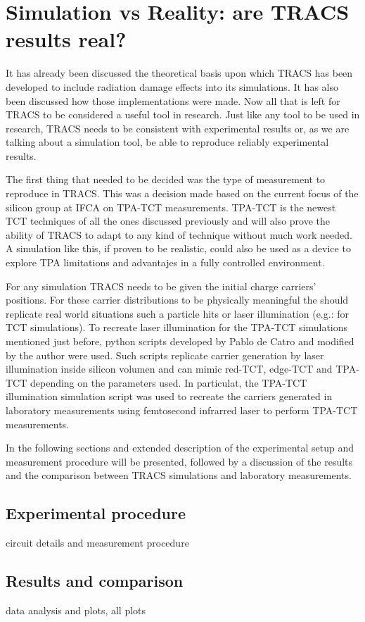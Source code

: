 \chapter{Simulation vs Reality: are TRACS results real?}

It has already been discussed the theoretical basis upon which TRACS has been developed to include radiation damage effects into its simulations. It has also been discussed how those implementations were made. Now all that is left for TRACS to be considered a useful tool in research. Just like any tool to be used in research, TRACS needs to be consistent with experimental results or, as we are talking about a simulation tool, be able to reproduce reliably experimental results.

The first thing that needed to be decided was the type of measurement to reproduce in TRACS. This was a decision made based on the current focus of the silicon group at IFCA \iffalse No se el nombre oficial \fi on TPA-TCT measurements. TPA-TCT is the newest TCT techniques of all the ones discussed previously and will also prove the ability of TRACS to adapt to any kind of technique without much work needed. A simulation like this, if proven to be realistic, could also be used as a device to explore TPA limitations and advantajes in a fully controlled environment.

For any simulation TRACS needs to be given the initial charge carriers' positions. For these carrier distributions to be physically meaningful the should replicate real world situations such a particle hits or laser illumination (e.g.: for TCT simulations). To recreate laser illumination for the TPA-TCT simulations mentioned just before, python scripts developed by Pablo de Catro and modified by the author were used. Such scripts replicate carrier generation by laser illumination inside silicon volumen and can mimic red-TCT, edge-TCT and TPA-TCT depending on the parameters used. In particulat, the TPA-TCT illumination simulation script was used to recreate the carriers generated in laboratory measurements using femtosecond infrarred laser to perform TPA-TCT measurements.

In the following sections and extended description of the experimental setup and  measurement procedure will be presented, followed by a discussion of the results and the comparison between TRACS simulations and laboratory measurements.
\section{Experimental procedure} %
\label{sec:future_improvements}

circuit details and measurement procedure


\section{Results and comparison} %
\label{sec:future_proyection}

data analysis and plots, all plots 


